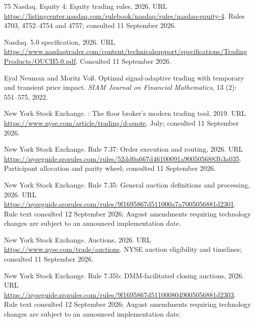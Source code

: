 \documentclass[11pt]{article}
\numberwithin{equation}{section}
\theoremstyle{definition}
\theoremstyle{remark}
\theoremstyle{definition}
\begin{document}
\begin{thebibliography}{75}
{Nasdaq}.
\newblock Equity 4: Equity trading rules, 2026{}.
\newblock URL
  \url{https://listingcenter.nasdaq.com/rulebook/nasdaq/rules/nasdaq-equity-4}.
\newblock Rules 4703, 4752--4754 and 4757; consulted 11 September 2026.

{Nasdaq}.
 5.0 specification, 2026{}.
\newblock URL
  \url{https://www.nasdaqtrader.com/content/technicalsupport/specifications/TradingProducts/OUCH5.0.pdf}.
\newblock Consulted 11 September 2026.

Eyal Neuman and Moritz Vo{\ss}.
\newblock Optimal signal-adaptive trading with temporary and transient price
  impact.
\newblock \emph{SIAM Journal on Financial Mathematics}, 13
  (2): 551--575, 2022.

{New York Stock Exchange}.
: The floor broker's modern trading tool, 2019.
\newblock URL \url{https://www.nyse.com/article/trading/d-quote}.
 July; consulted 11 September 2026.

{New York Stock Exchange}.
\newblock Rule 7.37: Order execution and routing, 2026{}.
\newblock URL
  \url{https://nyseguide.srorules.com/rules/52dd0a667d46100091a9005056883b3a035}.
\newblock Participant allocation and parity wheel; consulted 11 September 2026.

{New York Stock Exchange}.
\newblock Rule 7.35: General auction definitions and processing,
  2026{}.
\newblock URL
  \url{https://nyseguide.srorules.com/rules/9f1695867d511000a7a7005056881d2301}.
\newblock Rule text consulted 12 September 2026; August amendments requiring
  technology changes are subject to an announced implementation date.

{New York Stock Exchange}.
\newblock Auctions, 2026{}.
\newblock URL \url{https://www.nyse.com/trade/auctions}.
\newblock NYSE auction eligibility and timelines; consulted 11 September 2026.

{New York Stock Exchange}.
\newblock Rule 7.35b: {DMM}-facilitated closing auctions, 2026{}.
\newblock URL
  \url{https://nyseguide.srorules.com/rules/9f1695867d5110008049005056881d2303}.
\newblock Rule text consulted 12 September 2026; August amendments requiring
  technology changes are subject to an announced implementation date.


\end{thebibliography}
\end{document}
